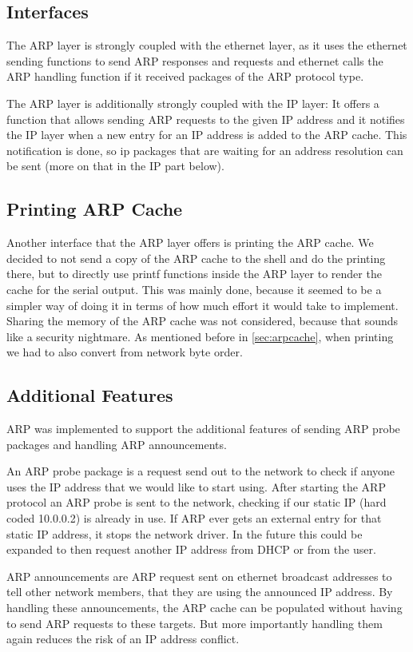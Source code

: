 \subsection{Interfaces}
The ARP layer is strongly coupled with the ethernet layer, as it uses the ethernet sending functions to send ARP responses and requests and ethernet calls the ARP handling function if it received packages of the ARP protocol type.

The ARP layer is additionally strongly coupled with the IP layer: It offers a function that allows sending ARP requests to the given IP address and it notifies the IP layer when a new entry for an IP address is added to the ARP cache. This notification is done, so ip packages that are waiting for an address resolution can be sent (more on that in the IP part below).

\subsection{Printing ARP Cache}
Another interface that the ARP layer offers is printing the ARP cache. We decided to not send a copy of the ARP cache to the shell and do the printing there, but to directly use printf functions inside the ARP layer to render the cache for the serial output. This was mainly done, because it seemed to be a simpler way of doing it in terms of how much effort it would take to implement. Sharing the memory of the ARP cache was not considered, because that sounds like a security nightmare. As mentioned before in \ref{sec:arpcache}, when printing we had to also convert from network byte order.

\subsection{Additional Features}
ARP was implemented to support the additional features of sending ARP probe packages and handling ARP announcements.

An ARP probe package is a request send out to the network to check if anyone uses the IP address that we would like to start using. After starting the ARP protocol an ARP probe is sent to the network, checking if our static IP (hard coded 10.0.0.2) is already in use. If ARP ever gets an external entry for that static IP address, it stops the network driver. In the future this could be expanded to then request another IP address from DHCP or from the user.

ARP announcements are ARP request sent on ethernet broadcast addresses to tell other network members, that they are using the announced IP address. By handling these announcements, the ARP cache can be populated without having to send ARP requests to these targets. But more importantly handling them again reduces the risk of an IP address conflict.

